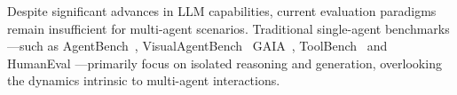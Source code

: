 Despite significant advances in LLM capabilities, current evaluation paradigms remain insufficient for multi-agent scenarios. Traditional single-agent benchmarks—such as AgentBench~\citep{liu2023agentbench}, VisualAgentBench~\citep{Sun2023VisualAgentBench}  GAIA~\citep{mialon2023gaia}, ToolBench~\citep{qin2024toolllm} and HumanEval \citep{Chen2021Evaluating}—primarily focus on isolated reasoning and generation, overlooking the dynamics intrinsic to multi-agent interactions. 


